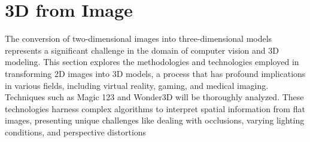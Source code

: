\section{3D from Image}\label{3d from image}

The conversion of two-dimensional images into three-dimensional models represents a significant challenge in the domain of computer vision and 3D modeling. This section explores the methodologies and technologies employed in transforming 2D images into 3D models, a process that has profound implications in various fields, including virtual reality, gaming, and medical imaging. Techniques such as Magic 123 and Wonder3D will be thoroughly analyzed. These technologies harness complex algorithms to interpret spatial information from flat images, presenting unique challenges like dealing with occlusions, varying lighting conditions, and perspective distortions


